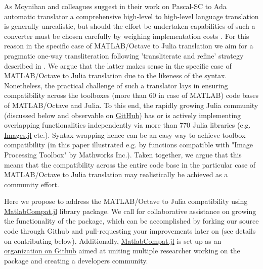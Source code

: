 As Moynihan and colleagues suggest in their work on Pascal-SC to Ada automatic translator a comprehensive high-level to high-level language translation is generally unrealistic, but should the effort be undertaken capabilities of such a converter must be chosen carefully by weighing implementation costs \cite{Moynihan_1991}. For this reason in the specific case of MATLAB/Octave to Julia translation we aim for a pragmatic one-way transliteration following 'transliterate and refine' strategy described in \cite{Waters_1988}. We argue that the latter makes sense in the specific case of MATLAB/Octave to Julia translation due to the likeness of the syntax. Nonetheless, the practical challenge of such a translator lays in ensuring compatibility across the toolboxes (more than 60 in case of MATLAB) code bases of MATLAB/Octave and Julia. To this end, the rapidly growing Julia community (discussed below and observable on \href{https://github.com/JuliaLang/METADATA.jl/graphs/commit-activity}{GitHub}) has or is actively implementing overlapping functionalities independently via more than 770 Julia libraries (e.g. \href{https://github.com/timholy/Images.jl}{Images.jl} etc.). Syntax wrapping hence can be an easy way to achieve toolbox compatibility (in this paper illustrated e.g. by functions compatible with "Image Processing Toolbox" by Mathworks Inc.). Taken together, we argue that this means that the compatibility across the entire code base in the particular case of MATLAB/Octave to Julia translation may realistically be achieved as a community effort.

Here we propose to address the MATLAB/Octave to Julia compatibility using \href{https://github.com/MatlabCompat/MatlabCompat.jl}{MatlabCompat.jl} library package. We call for collaborative assistance on growing the functionality of the package, which can be accomplished by forking our source code through Github and pull-requesting your improvements later on (see details on contributing below). Additionally, \href{http://matlabcompat.github.io/}{MatlabCompat.jl} is set up as an \href{https://github.com/MatlabCompat}{organization on Github} aimed at uniting multiple researcher working on the package and creating a developers community.
  